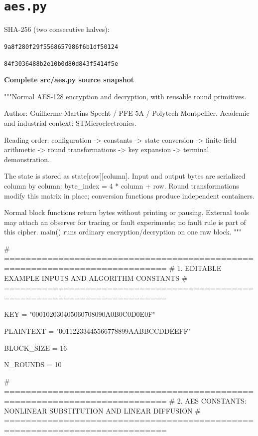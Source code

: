 \section{\texttt{aes.py}}\label{source:aes}
\noindent SHA-256 (two consecutive halves):\par
\texttt{9a8f280f29f5568657986f6b1df50124}\par
\texttt{84f3036488b2e10b0d80d843f5414f5e}\par
\par\smallskip\noindent\textbf{Complete src/aes.py source snapshot}\par
\begin{lightcode}[numbers=left,firstnumber=1]
"""Normal AES-128 encryption and decryption, with reusable round primitives.

Author: Guilherme Martins Specht / PFE 5A / Polytech Montpellier.
Academic and industrial context: STMicroelectronics.

Reading order: configuration -> constants -> state conversion -> finite-field
arithmetic -> round transformations -> key expansion -> terminal demonstration.

The state is stored as state[row][column]. Input and output bytes are serialized
column by column: byte_index = 4 * column + row. Round transformations modify
this matrix in place; conversion functions produce independent containers.

Normal block functions return bytes without printing or pausing. External tools
may attach an observer for tracing or fault experiments; no fault rule is part
of this cipher. main() runs ordinary encryption/decryption on one raw block.
"""


# ============================================================================
# 1. EDITABLE EXAMPLE INPUTS AND ALGORITHM CONSTANTS
# ============================================================================


KEY = "000102030405060708090A0B0C0D0E0F"


PLAINTEXT = "00112233445566778899AABBCCDDEEFF"


BLOCK_SIZE = 16


N_ROUNDS = 10


# ============================================================================
# 2. AES CONSTANTS: NONLINEAR SUBSTITUTION AND LINEAR DIFFUSION
# ============================================================================



\end{lightcode}
